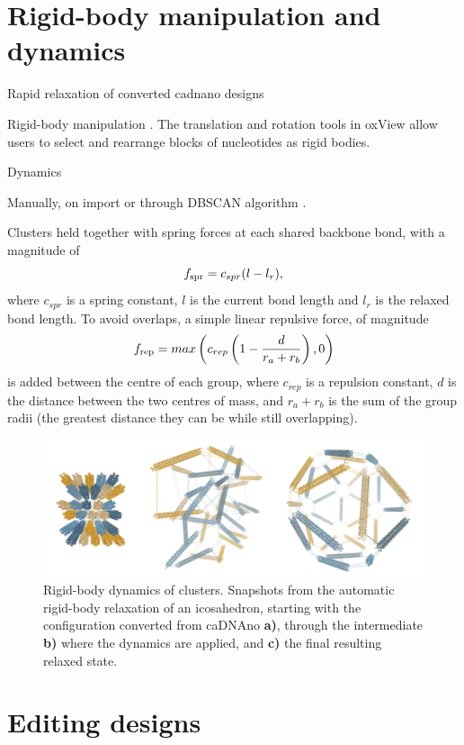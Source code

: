 \section{Rigid-body manipulation and dynamics}
\label{sec:rigid-body_dynamics}
Rapid relaxation of converted cadnano designs

Rigid-body manipulation \cite{huang2019uncertainty}. The translation and rotation tools in oxView allow users to select and rearrange blocks of nucleotides as rigid bodies. 

Dynamics \cite{baraff1997introduction}

Manually, on import or through DBSCAN algorithm \cite{ester1996density}.

Clusters held together with spring forces at each shared backbone bond, with a magnitude of 
$$ f_{\rm spr} = c_{spr}(l - l_r),$$
where \(c_{spr}\) is a spring constant, \(l\) is the current bond length and \(l_r\) is the relaxed bond length. To avoid overlaps, a simple linear repulsive force, of magnitude
$$ f_{\rm rep} = max\left(c_{rep}\left(1-\frac{d}{r_a+r_b}\right),0\right)$$ is added between the centre of each group, where \(c_{rep}\) is a repulsion constant, \(d\) is the distance between the two centres of mass, and \(r_a+r_b\) is the sum of the group radii (the greatest distance they can be while still overlapping).

\begin{figure}
\centering\includegraphics[width=\textwidth]{figures/icosahedron.png} 
\caption{Rigid-body dynamics of clusters. Snapshots from the automatic rigid-body relaxation of an icosahedron, starting with the configuration converted from caDNAno \textbf{a)}, through the intermediate \textbf{b)} where the dynamics are applied, and \textbf{c)} the final resulting relaxed state.}
\label{fig:rigidBody}\end{figure}

\section{Editing designs}

